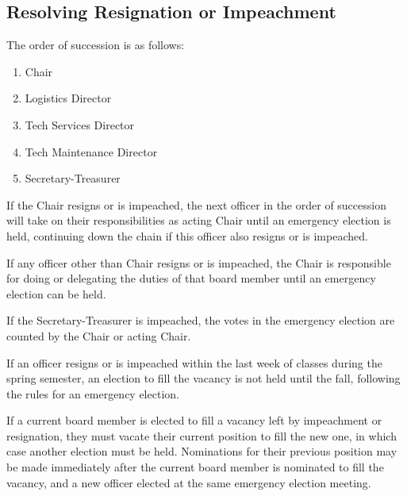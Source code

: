 	\subsection{Resolving Resignation or Impeachment}\label{sub:resolving-resignation-or-impeachment}

The order of succession is as follows:
\begin{enumerate}
	\item Chair
	\item Logistics Director
	\item Tech Services Director
	\item Tech Maintenance Director
	\item Secretary-Treasurer
\end{enumerate}

If the Chair resigns or is impeached, the next officer in the order of succession will take on their responsibilities as acting Chair until an emergency election is held, continuing down the chain if this officer also resigns or is impeached.

If any officer other than Chair resigns or is impeached, the Chair is responsible for doing or delegating the duties of that board member until an emergency election can be held.

If the Secretary-Treasurer is impeached, the votes in the emergency election are counted by the Chair or acting Chair.

If an officer resigns or is impeached within the last week of classes during the spring semester, an election to fill the vacancy is not held until the fall, following the rules for an emergency election.

If a current board member is elected to fill a vacancy left by impeachment or resignation, they must vacate their current position to fill the new one, in which case another election must be held. Nominations for their previous position may be made immediately after the current board member is nominated to fill the vacancy, and a new officer elected at the same emergency election meeting.
